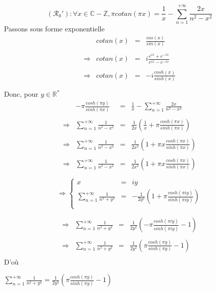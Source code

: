 \[
  (\mathcal{R}_0') : \forall x \in \mathbb{C} - \mathbb{Z}, \pi cotan(\pi x) = \frac{1}{x} - \sum\limits_{n=1}^{+\infty}\frac{2x}{n^2-x^2}
\]
Passons sous forme exponentielle
\[
  \begin{array}{rrcl}
                & cotan(x) & = & \frac{cos(x)}{sin(x)}                  \\\\
    \Rightarrow & cotan(x) & = & i\frac{e^{ix}+e^{-ix}}{e^{ix}-e^{-ix}} \\\\
    \Rightarrow & cotan(x) & = & -i\frac{cosh(x)}{sinh(x)}              \\\\
  \end{array}
\]
Donc, pour $y\in\mathbb{R}^*$
\[
  \begin{array}{rrcl}
                & -\pi \frac{cosh(\pi y)}{sinh(\pi x) }        & = & \frac{1}{x} - \sum\limits_{n=1}^{+\infty}\frac{2x}{n^2-x^2}                \\\\
    \Rightarrow & \sum\limits_{n=1}^{+\infty}\frac{1}{n^2-x^2} & = & \frac{1}{2x}\left(\frac{1}{x} + \pi \frac{cosh(\pi x)}{sinh(\pi x)}\right) \\\\
    \Rightarrow & \sum\limits_{n=1}^{+\infty}\frac{1}{n^2-x^2} & = & \frac{1}{2x^2}\left(1 + \pi x \frac{cosh(\pi x)}{sinh(\pi x)}\right)       \\\\
    \Rightarrow & \sum\limits_{n=1}^{+\infty}\frac{1}{n^2-x^2} & = & \frac{1}{2x^2}\left(1 + \pi x \frac{cosh(\pi x)}{sinh(\pi x)}\right)       \\\\
  \end{array}
\]
\[
  \Rightarrow\left\{
  \begin{array}{rcl}
    x                                            & = & iy                                                                    \\
    \sum\limits_{n=1}^{+\infty}\frac{1}{n^2+y^2} & = & -\frac{1}{2y^2}\left(1 + \pi \frac{cosh(\pi iy)}{sinh(\pi iy)}\right) \\
  \end{array}
  \right.
\]

\[
  \begin{array}{crcl}
    \Rightarrow & \sum\limits_{n=1}^{+\infty}\frac{1}{n^2+y^2} & = & \frac{1}{2y^2}\left(-\pi \frac{cosh(\pi iy)}{sinh(\pi iy)}-1\right) \\\\
    \Rightarrow & \sum\limits_{n=1}^{+\infty}\frac{1}{n^2+y^2} & = & \frac{1}{2y^2}\left(\pi \frac{cosh(\pi y)}{sinh(\pi y)}-1\right)    \\
  \end{array}
\]
D'où
\begin{result}
  $\sum\limits_{n=1}^{+\infty}\frac{1}{n^2+y^2} = \frac{1}{2y^2}\left(\pi \frac{cosh(\pi y)}{sinh(\pi y)}-1\right)$
\end{result}
